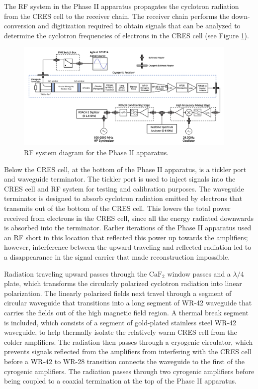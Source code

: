 The RF system in the Phase II apparatus propagates the cyclotron radiation from the CRES cell to the receiver chain. The receiver chain performs the down-conversion and digitization required to obtain signals that can be analyzed to determine the cyclotron frequencies of electrons in the CRES cell (see Figure \ref{fig:chap3-phase2-rf-chain}).
\begin{figure}[htbp]
    \centering
    \includegraphics*[width=0.95\textwidth]{figs/Chapter-3/230620_phase2_rf_chain.png}
    \caption{\label{fig:chap3-phase2-rf-chain} RF system diagram for the Phase II apparatus.}
\end{figure}

Below the CRES cell, at the bottom of the Phase II apparatus, is a tickler port and waveguide terminator. The tickler port is used to inject signals into the CRES cell and RF system for testing and calibration purposes. The waveguide terminator is designed to absorb cyclotron radiation emitted by electrons that transmits out of the bottom of the CRES cell. This lowers the total power received from electrons in the CRES cell, since all the energy radiated downwards is absorbed into the terminator. Earlier iterations of the Phase II apparatus used an RF short in this location that reflected this power up towards the amplifiers; however, interference between the upward traveling and reflected radiation led to a disappearance in the signal carrier that made reconstruction impossible.

Radiation traveling upward passes through the $\mathrm{CaF}_2$ window passes and a $\lambda/4$ plate, which transforms the circularly polarized cyclotron radiation into linear polarization. The linearly polarized fields next travel through a segment of circular waveguide that transitions into a long segment of WR-42 waveguide that carries the fields out of the high magnetic field region. A thermal break segment is included, which consists of a segment of gold-plated stainless steel WR-42 waveguide, to help thermally isolate the relatively warm CRES cell from the colder amplifiers. The radiation then passes through a cryogenic circulator, which prevents signals reflected from the amplifiers from interfering with the CRES cell before a WR-42 to WR-28 transition connects the waveguide to the first of the cyrogenic amplifiers. The radiation passes through two cyrogenic amplifiers before being coupled to a coaxial termination at the top of the Phase II apparatus.

